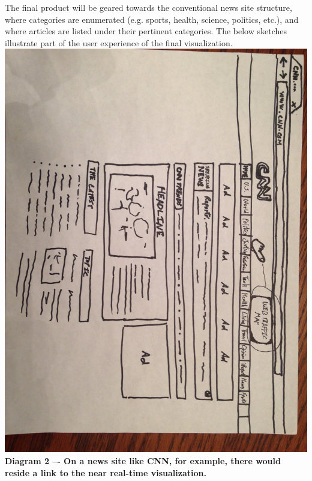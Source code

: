 \documentclass[12pt]{article}
\begin{document}
The final product will be geared towards the conventional news site structure, where categories are enumerated (e.g. sports, health, science, politics, etc.), and where articles are listed under their pertinent categories. The below sketches illustrate part of the user experience of the final visualization.\\

\noindent\includegraphics[scale=0.2]{img/cnn_example}
\noindent\textbf{Diagram 2 –- On a news site like CNN, for example, there would reside a link to the near real-time visualization.}
\end{document}
